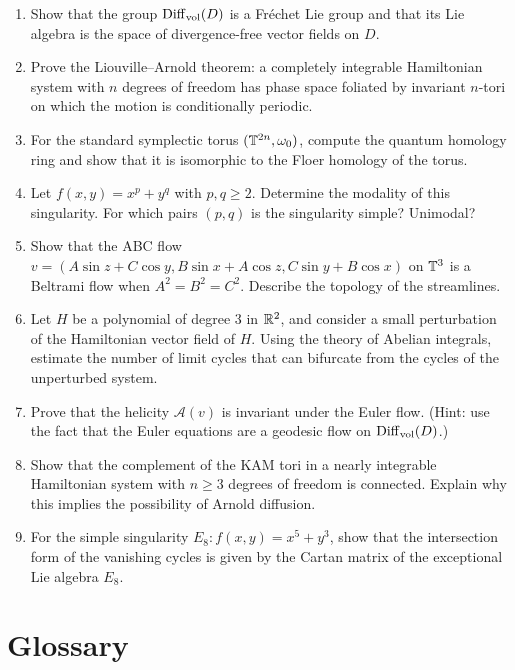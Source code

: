 \begin{enumerate}
    \item [A] Show that the group \(\operatorname{Diff}_{\operatorname{vol}}(D)\) is a Fr\'echet Lie group and that its Lie algebra is the space of divergence-free vector fields on \(D\).
    \item [I] Prove the Liouville--Arnold theorem: a completely integrable Hamiltonian system with \(n\) degrees of freedom has phase space foliated by invariant \(n\)-tori on which the motion is conditionally periodic.
    \item [A] For the standard symplectic torus \((\mathbb{T}^{2n},\omega_0)\), compute the quantum homology ring and show that it is isomorphic to the Floer homology of the torus.
    \item [I] Let \(f(x,y) = x^p + y^q\) with \(p,q \geq 2\). Determine the modality of this singularity. For which pairs \((p,q)\) is the singularity simple? Unimodal?
    \item [I] Show that the ABC flow \(v = (A\sin z + C\cos y, B\sin x + A\cos z, C\sin y + B\cos x)\) on \(\mathbb{T}^3\) is a Beltrami flow when \(A^2 = B^2 = C^2\). Describe the topology of the streamlines.
    \item [A] Let \(H\) be a polynomial of degree 3 in \(\mathbb{R}^2\), and consider a small perturbation of the Hamiltonian vector field of \(H\). Using the theory of Abelian integrals, estimate the number of limit cycles that can bifurcate from the cycles of the unperturbed system.
    \item [I] Prove that the helicity \(\mathcal{A}(v)\) is invariant under the Euler flow. (Hint: use the fact that the Euler equations are a geodesic flow on \(\operatorname{Diff}_{\operatorname{vol}}(D)\).)
    \item [A] Show that the complement of the KAM tori in a nearly integrable Hamiltonian system with \(n \geq 3\) degrees of freedom is connected. Explain why this implies the possibility of Arnold diffusion.
    \item [A] For the simple singularity \(E_8: f(x,y) = x^5 + y^3\), show that the intersection form of the vanishing cycles is given by the Cartan matrix of the exceptional Lie algebra \(E_8\).
\end{enumerate}

\section*{Glossary}

